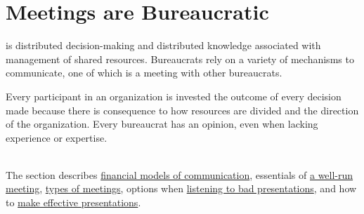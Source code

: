 \documentclass[openright]{book}
\begin{document}
 \iftoggle{cpforsection}{\clearpage}{} %
     \iftoggle{cpforsection}{\clearpage}{} %
     \iftoggle{cpforsection}{\clearpage}{} %
     \iftoggle{cpforsection}{\clearpage}{} %
     \iftoggle{cpforsection}{\clearpage}{} %
     \iftoggle{cpforsection}{\clearpage}{} %
     \iftoggle{cpforsection}{\clearpage}{} 
    

    \section{Meetings are Bureaucratic\label{sec:meetings}}
\iftoggle{glossarysubstitutionworks}{\Gls{bureaucracy}}{Bureaucracy}
    is distributed decision-making and distributed knowledge associated with management of shared resources. Bureaucrats rely on a variety of mechanisms to communicate, one of which is a meeting with other bureaucrats. 

    Every participant in an organization is invested the outcome of every decision made because there is consequence to how resources are divided and the direction of the organization. Every bureaucrat has an opinion, even when lacking experience or expertise. 

    \ \\

    The section describes \hyperref[sec:financial-models-of-communication]{financial models of communication}, essentials of \hyperref[sec:well-run-meeting]{a well-run meeting}, \hyperref[sec:characterizing-meetings]{types of meetings}, options when \hyperref[sec:bad-presentations]{listening to bad presentations}, and how to \hyperref[sec:effective-presentations]{make effective presentations}.

        
         
         
         
        
        
\end{document}

